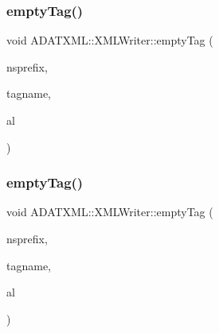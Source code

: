 \mbox{\label{classADATXML_1_1XMLWriter_a7b356346477d6f2e8e2d2db7553147dc}} 
\subsubsection{\texorpdfstring{emptyTag()}{emptyTag()}\hspace{0.1cm}{\footnotesize\ttfamily [11/12]}}
{\footnotesize\ttfamily void A\+D\+A\+T\+X\+M\+L\+::\+X\+M\+L\+Writer\+::empty\+Tag (\begin{DoxyParamCaption}\item[{const std\+::string \&}]{nsprefix,  }\item[{const std\+::string \&}]{tagname,  }\item[{\mbox{\hyperlink{namespaceXMLWriterAPI_a28cf3d8051a4ccf0aef208b7ebc66d07}{X\+M\+L\+Writer\+A\+P\+I\+::\+Attribute\+List}} \&}]{al }\end{DoxyParamCaption})}

\mbox{\label{classADATXML_1_1XMLWriter_a7b356346477d6f2e8e2d2db7553147dc}} 
\subsubsection{\texorpdfstring{emptyTag()}{emptyTag()}\hspace{0.1cm}{\footnotesize\ttfamily [12/12]}}
{\footnotesize\ttfamily void A\+D\+A\+T\+X\+M\+L\+::\+X\+M\+L\+Writer\+::empty\+Tag (\begin{DoxyParamCaption}\item[{const std\+::string \&}]{nsprefix,  }\item[{const std\+::string \&}]{tagname,  }\item[{\mbox{\hyperlink{namespaceXMLWriterAPI_a28cf3d8051a4ccf0aef208b7ebc66d07}{X\+M\+L\+Writer\+A\+P\+I\+::\+Attribute\+List}} \&}]{al }\end{DoxyParamCaption})}

\mbox{\label{classADATXML_1_1XMLWriter_a5599aaa358e07c8c7a4b7a137ec3e43a}} 
